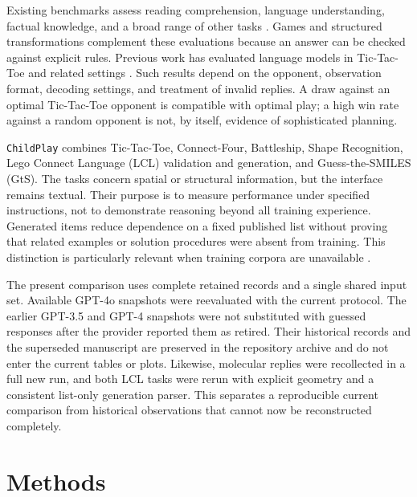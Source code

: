 \documentclass[12pt,letterpaper]{article}
\begin{document}
Existing benchmarks assess reading comprehension, language understanding, factual knowledge, and a broad range of other tasks \cite{rajpurkar2016squad,wang2019glue,srivastava2023beyond,childplayReviewSuperGLUE2019}. Games and structured transformations complement these evaluations because an answer can be checked against explicit rules. Previous work has evaluated language models in Tic-Tac-Toe and related settings \cite{Liga2023TestingSR,Topsakal2024BenchmarkingLL}. Such results depend on the opponent, observation format, decoding settings, and treatment of invalid replies. A draw against an optimal Tic-Tac-Toe opponent is compatible with optimal play; a high win rate against a random opponent is not, by itself, evidence of sophisticated planning.

\texttt{ChildPlay} combines Tic-Tac-Toe, Connect-Four, Battleship, Shape Recognition, Lego Connect Language (LCL) validation and generation, and Guess-the-SMILES (GtS). The tasks concern spatial or structural information, but the interface remains textual. Their purpose is to measure performance under specified instructions, not to demonstrate reasoning beyond all training experience. Generated items reduce dependence on a fixed published list without proving that related examples or solution procedures were absent from training. This distinction is particularly relevant when training corpora are unavailable \cite{brown,bender2021dangers}.

The present comparison uses complete retained records and a single shared input set. Available GPT-4o snapshots were reevaluated with the current protocol. The earlier GPT-3.5 and GPT-4 snapshots were not substituted with guessed responses after the provider reported them as retired. Their historical records and the superseded manuscript are preserved in the repository archive and do not enter the current tables or plots. Likewise, molecular replies were recollected in a full new run, and both LCL tasks were rerun with explicit geometry and a consistent list-only generation parser. This separates a reproducible current comparison from historical observations that cannot now be reconstructed completely.

\section*{Methods}
\end{document}
